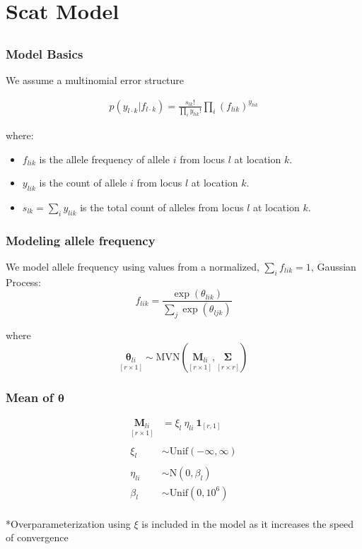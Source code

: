 \section{Scat Model}
\subsection{}

\begin{frame}
\frametitle{Model Basics}

We assume a multinomial error structure

\begin{align*}
p(y_{l \cdot k}|f_{l \cdot k}) = \frac{s_{lk}!}{\prod_i y_{lik}!} \prod_i (f_{lik})^{y_{lik}}
\end{align*}

where:\\

\begin{itemize}
\item $f_{lik}$ is the allele frequency of allele $i$ from locus $l$ at location $k$.
\item $y_{lik}$ is the count of allele $i$ from locus $l$ at location $k$.
\item $s_{lk} = \sum_i y_{lik}$ is the total count of alleles from locus $l$ at location $k$.
\end{itemize}

\end{frame}


\begin{frame}
\frametitle{Modeling allele frequency}


We model allele frequency using values from a normalized, $\sum_i f_{lik} = 1$, Gaussian Process:\\
\[
f_{lik} = \frac{\exp(\theta_{lik})}{\sum_j \exp(\theta_{ljk})}
\]

where
\[
\underset{[r \times 1]}{\bm{\theta}_{li}} \sim \text{MVN}( \underset{[r \times 1]}{\bm{M}_{li}}, \underset{[r \times r]}{\bm{\Sigma_{}}})
\]

\end{frame}

\begin{frame}
\frametitle{Mean of $\bm\theta$}

\begin{align*}
\underset{[r \times 1]}{\bm{M}_{li}} &=  \xi_l ~ \eta_{li} ~ \bm{1}_{[r,1]}\\\\
\xi_l &\sim \text{Unif}(-\infty,\infty)\\\\
\eta_{li} &\sim \text{N}(0,\beta_l)\\
\beta_l &\sim \text{Unif}(0,10^6)\\
\end{align*}

{\footnotesize
*Overparameterization using $\xi$ is included in the model as it increases the speed of convergence
}
\end{frame}


